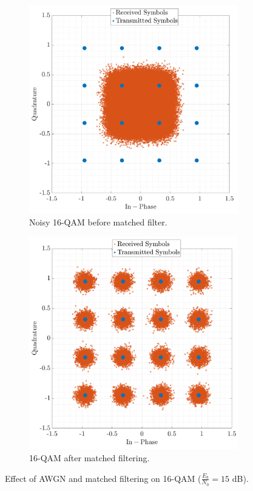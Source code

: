 \documentclass[11pt]{article}
\begin{document}
	\begin{figure}[H]
		\centering
		\begin{subfigure}{0.48\textwidth}
			\includegraphics[width=\linewidth]{Images/const-noisy.png}
			\caption{Noisy 16-QAM before matched filter.}
			\label{fig:const-noisy_cont_compact}
		\end{subfigure}\hfill
		\begin{subfigure}{0.48\textwidth}
			\includegraphics[width=\linewidth]{Images/const-filtered-down.png}      
			\caption{16-QAM after matched filtering.}
			\label{fig:const-filtered-down_cont_compact}
		\end{subfigure}
		\caption{Effect of AWGN and matched filtering on 16-QAM ($\frac{E_b}{N_0} = 15$ dB).}
		\label{fig:constellations-noise_cont}
	\end{figure}
	
\end{document}
